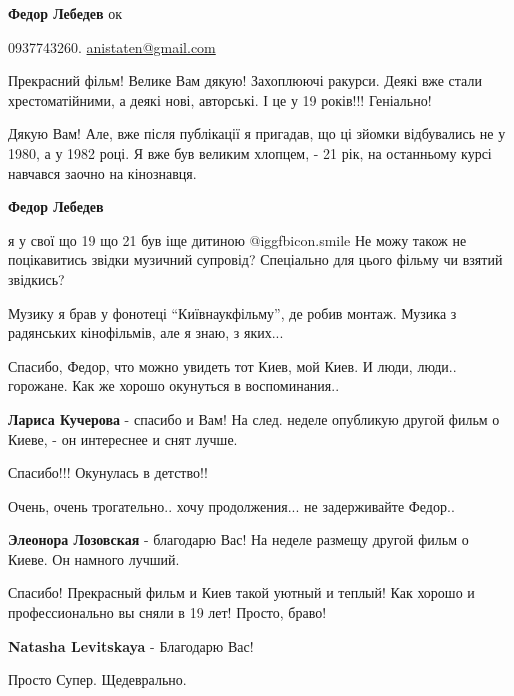 \begin{itemize}
\begin{itemize}
\textbf{Федор Лебедев} ок

0937743260. \url{anistaten@gmail.com}
\end{itemize} %


Прекрасний фільм! Велике Вам дякую! Захоплюючі ракурси. Деякі вже стали
хрестоматійними, а деякі нові, авторські. І це у 19 років!!! Геніально!

\begin{itemize} %

Дякую Вам! Але, вже після публікації я пригадав, що ці зйомки відбувались не у
1980, а у 1982 році. Я вже був великим хлопцем, - 21 рік, на останньому курсі
навчався заочно на кінознавця.

\textbf{Федор Лебедев} 

я у свої що 19 що 21 був іще дитиною  @igg{fbicon.smile}  Не можу також не
поцікавитись звідки музичний супровід? Спеціально для цього фільму чи взятий
звідкись?

Музику я брав у фонотеці \enquote{Київнаукфільму}, де робив монтаж. Музика з
радянських кінофільмів, але я знаю, з яких...
\end{itemize} %


Спасибо, Федор, что можно увидеть тот Киев, мой Киев. И люди, люди.. горожане.
Как же хорошо окунуться в воспоминания..

\textbf{Лариса Кучерова} - спасибо и Вам! На след. неделе опубликую другой фильм о Киеве, - он интереснее и снят лучше.

Спасибо!!! Окунулась в детство!!

Очень, очень трогательно.. хочу продолжения... не задерживайте Федор..

\textbf{Элеонора Лозовская} - благодарю Вас! На неделе размещу другой фильм о Киеве. Он намного лучший.


Спасибо! Прекрасный фильм и Киев такой уютный и теплый!
Как хорошо и профессионально вы сняли в 19 лет! Просто, браво!

\textbf{Natasha Levitskaya} - Благодарю Вас!

Просто Супер. Щедеврально.


\end{itemize}
